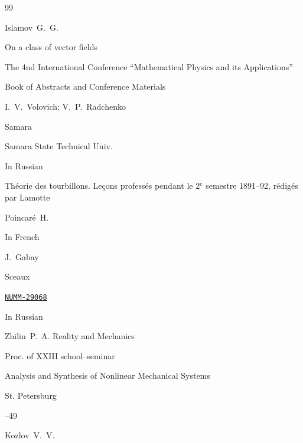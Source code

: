\begin{thebibliography}{99}




\by  Islamov~G.~G.

\paper On a class of vector fields


\inbook  The 4nd International Conference ``Mathe\-ma\-tical Physics and its Applications''

\bookinfo Book of Abstracts and Conference Materials

\eds I.~V.~Volovich; V.~P.~Radchenko

\publaddr Samara

\publ Samara State Technical Univ.


\lang In Russian






\book Th\'eorie des tourbillons.  Le\c{c}ons profess\'es pendant le 2$^e$ semestre 1891--92, r\'edig\'es par Lamotte


\by Poincar\'e~H.



\lang In French

\publ J.~Gabay 

\publaddr Sceaux


\elink \href{visualiseur.bnf.fr/CadresFenetre?O=NUMM-29068}{\tt NUMM-29068}




\lang In Russian

\by Zhilin~P.~A. Reality and Mechanics

\bookinfo Proc. of XXIII school–seminar 

\inbook Analysis and Synthesis of Nonlinear Mechanical Systems

\publaddr St. Petersburg


–49




\by Kozlov~V.~V.


\end{thebibliography}
